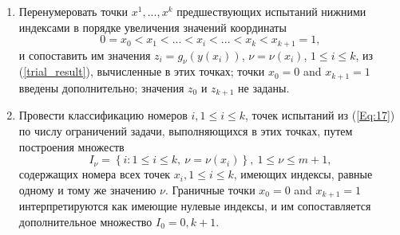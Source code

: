 \documentclass[
11pt,%
tightenlines,%
twoside,%
onecolumn,%
nofloats,%
nobibnotes,%
nofootinbib,%
superscriptaddress,%
noshowpacs,%
centertags]%
{revtex4}
\begin{document}
\begin{enumerate}
\item 
Перенумеровать точки $x^1,...,x^k$ предшествующих испытаний нижними индексами в порядке увеличения значений координаты
\begin{equation}\label{Eq:17}
0=x_0<x_1<...<x_i<...<x_k<x_{k+1}=1,
\end{equation}
и сопоставить им значения $z_i=g_\nu(y(x_i))$, $\nu=\nu(x_i)$, $1 \leq i \leq k$, из (\ref{trial_result}), вычисленные в этих точках; точки $x_0=0$ and $x_{k+1}=1$ введены дополнительно; значения $z_0$ и $z_{k+1}$ не заданы.
\item
Провести классификацию номеров  $i,1\leq i \leq k$, точек испытаний из  (\ref{Eq:17}) по числу ограничений задачи, выполняющихся в этих точках, путем построения множеств
\begin{equation}\label{Eq:18}
I_\nu = \left\{i: 1 \leq i \leq k,\ \nu = \nu(x_i)\right\},\ 1 \leq \nu \leq m+1,
\end{equation}
содержащих номера всех точек  $x_i,1\leq i \leq k$, имеющих индексы, равные одному и тому же значению $\nu$. Граничные точки $x_0=0$ and $x_{k+1}=1$ интерпретируются как имеющие нулевые индексы, и им сопоставляется дополнительное множество $I_0={0,k+1}$. 


\end{enumerate}
\end{document}
